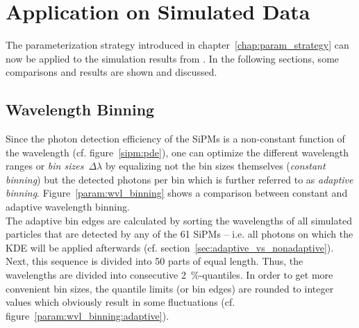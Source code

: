 \chapter{Application on Simulated Data}

The parameterization strategy introduced in chapter~\ref{chap:param_strategy} can now be applied to the simulation results from \geant. In the following sections, some comparisons and results are shown and discussed.

\section{Wavelength Binning}\label{sec:wvl_binning}

Since the photon detection efficiency of the SiPMs is a non-constant function of the wavelength (cf. figure~\ref{sipm:pde}), one can optimize the different wavelength ranges or \textit{bin sizes}~$\Delta\lambda$ by equalizing not the bin sizes themselves (\textit{constant binning}) but the detected photons per bin which is further referred to as \textit{adaptive binning}. Figure~\ref{param:wvl_binning} shows a comparison between constant and adaptive wavelength binning.\\

The adaptive bin edges are calculated by sorting the wavelengths of all simulated particles that are detected by any of the 61 SiPMs -- i.e. all photons on which the KDE will be applied afterwards (cf. section~\ref{sec:adaptive_vs_nonadaptive}). Next, this sequence is divided into \num{50} parts of equal length. Thus, the wavelengths are divided into consecutive \SI{2}{\percent}-quantiles. In order to get more convenient bin sizes, the quantile limits (or bin edges) are rounded to integer values which obviously result in some fluctuations (cf. figure~\ref{param:wvl_binning:adaptive}).\\

